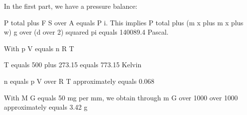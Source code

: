 In the first part, we have a pressure balance:

P total plus F S over A equals P i. This implies P total plus (m x plus m x plus w) g over (d over 2) squared pi equals 140089.4 Pascal.

With p V equals n R T

T equals 500 plus 273.15 equals 773.15 Kelvin

n equals p V over R T approximately equals 0.068

With M G equals 50 mg per mm, we obtain through m G over 1000 over 1000 approximately equals 3.42 g
